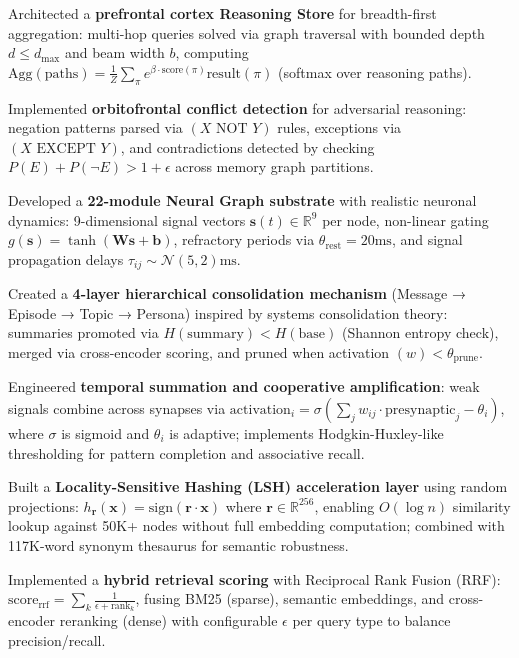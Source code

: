 \documentclass[letterpaper,10pt]{article}
\newcommand{\resumeItem}[1]{\item\small{#1 \vspace{1pt}}}
\begin{document}
      \resumeItem{Architected a \textbf{prefrontal cortex Reasoning Store} for breadth-first aggregation: multi-hop queries solved via graph traversal with bounded depth $d \leq d_{\max}$ and beam width $b$, computing $\text{Agg}(\text{paths}) = \frac{1}{Z} \sum_{\pi} e^{\beta \cdot \text{score}(\pi)} \text{result}(\pi)$ (softmax over reasoning paths).}

      \resumeItem{Implemented \textbf{orbitofrontal conflict detection} for adversarial reasoning: negation patterns parsed via $(X \text{ NOT } Y)$ rules, exceptions via $(X \text{ EXCEPT } Y)$, and contradictions detected by checking $P(E) + P(\neg E) > 1 + \epsilon$ across memory graph partitions.}

      \resumeItem{Developed a \textbf{22-module Neural Graph substrate} with realistic neuronal dynamics: 9-dimensional signal vectors $\mathbf{s}(t) \in \mathbb{R}^9$ per node, non-linear gating $g(\mathbf{s}) = \tanh(\mathbf{W}\mathbf{s} + \mathbf{b})$, refractory periods via $\theta_{\text{rest}} = 20\text{ms}$, and signal propagation delays $\tau_{ij} \sim \mathcal{N}(5, 2)\text{ms}$.}

      \resumeItem{Created a \textbf{4-layer hierarchical consolidation mechanism} (Message → Episode → Topic → Persona) inspired by systems consolidation theory: summaries promoted via $H(\text{summary}) < H(\text{base})$ (Shannon entropy check), merged via cross-encoder scoring, and pruned when activation $(w) < \theta_{\text{prune}}$.}

      \resumeItem{Engineered \textbf{temporal summation and cooperative amplification}: weak signals combine across synapses via $\text{activation}_i = \sigma(\sum_j w_{ij} \cdot \text{presynaptic}_j - \theta_i)$, where $\sigma$ is sigmoid and $\theta_i$ is adaptive; implements Hodgkin-Huxley-like thresholding for pattern completion and associative recall.}

      \resumeItem{Built a \textbf{Locality-Sensitive Hashing (LSH) acceleration layer} using random projections: $h_{\mathbf{r}}(\mathbf{x}) = \text{sign}(\mathbf{r} \cdot \mathbf{x})$ where $\mathbf{r} \in \mathbb{R}^{256}$, enabling $O(\log n)$ similarity lookup against 50K+ nodes without full embedding computation; combined with 117K-word synonym thesaurus for semantic robustness.}

      \resumeItem{Implemented a \textbf{hybrid retrieval scoring} with Reciprocal Rank Fusion (RRF): $\text{score}_{\text{rrf}} = \sum_k \frac{1}{\epsilon + \text{rank}_k}$, fusing BM25 (sparse), semantic embeddings, and cross-encoder reranking (dense) with configurable $\epsilon$ per query type to balance precision/recall.}
\end{document}
